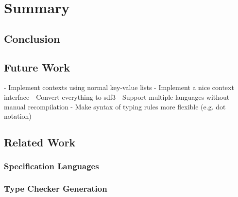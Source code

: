 \chapter{Summary}
\section{Conclusion}
\section{Future Work}
- Implement contexts using normal key-value lists
- Implement a nice context interface
- Convert everything to sdf3
- Support multiple languages without manual recompilation
- Make syntax of typing rules more flexible (e.g. dot notation)
\section{Related Work}
\subsection{Specification Languages}
\subsection{Type Checker Generation}

